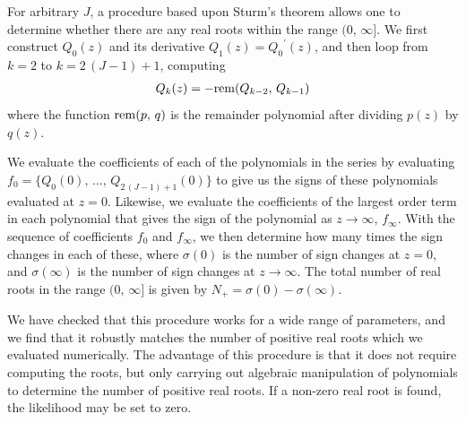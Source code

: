\documentclass[manuscript, letterpaper]{aastex6}
\makeatletter
\let\origsection\section
\renewcommand\section{\@ifstar{\starsection}{\nostarsection}}
\newcommand\nostarsection[1]{\sectionprelude\origsection{#1}}
\newcommand\starsection[1]{\sectionprelude\origsection*{#1}}
\newcommand\sectionprelude{\vspace{1em}}
\makeatother
\begin{document}
For arbitrary $J$, a procedure based upon Sturm's theorem \citep{Dorrie:1965}
allows one to determine whether there are any real roots within the range
$(0,\,\infty]$.
We first construct $Q_0(z)$ and its derivative $Q_1(z) = {Q_0}^\prime(z)$,
and then loop from $k=2$ to $k=2\,(J-1)+1$, computing
\begin{eqnarray}
Q_k(z) = -{\rm rem}(Q_{k-2},\,Q_{k-1})
\end{eqnarray}
where the function ${\rm rem}(p,\,q)$ is the remainder polynomial after
dividing $p(z)$ by $q(z)$.

We evaluate the coefficients of each of the polynomials in the series by
evaluating $f_0 = \{Q_0(0),\,\ldots,\,Q_{2\,(J-1)+1}(0)\}$ to give us the signs
of these polynomials evaluated at $z=0$.
Likewise, we evaluate the coefficients of the largest order term in each
polynomial that gives the sign of the polynomial as $z \rightarrow \infty$,
$f_\infty$.
With the sequence of coefficients $f_0$ and $f_\infty$, we then determine how
many times the sign changes in each of these, where $\sigma(0)$ is the number
of sign changes at $z=0$, and $\sigma(\infty)$ is the number of sign changes
at $z \rightarrow \infty$.
The total number of real roots in the range
$(0,\,\infty]$ is given by $N_{+}=\sigma(0)-\sigma(\infty)$.

We have checked that this procedure works for a wide range of parameters, and
we find that it robustly matches the number of positive real roots which we
evaluated numerically.
The advantage of this procedure is that it does not require computing the
roots, but only carrying out algebraic manipulation of polynomials to
determine the number of positive real roots.
If a non-zero real root is found, the likelihood may be set to zero.

\section{Semiseparable operations} \label{operations}
\end{document}
